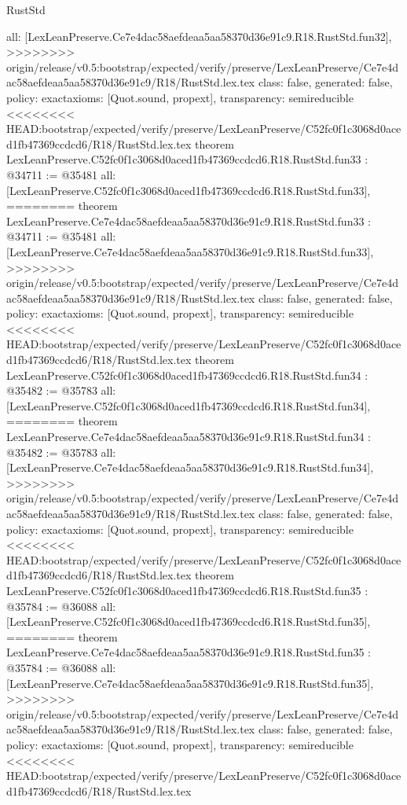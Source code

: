 \begin{lexlean}{RustStd}
\begin{coremodule}
{\begin{coremodule}
{{{{{{{{{{{{{{{{{{{{{{{{{{{{{{{{{{{{  all: [LexLeanPreserve.Ce7e4dac58aefdeaa5aa58370d36e91c9.R18.RustStd.fun32],
>>>>>>>> origin/release/v0.5:bootstrap/expected/verify/preserve/LexLeanPreserve/Ce7e4dac58aefdeaa5aa58370d36e91c9/R18/RustStd.lex.tex
  class: false,
  generated: false,
  policy: exact{axioms: [Quot.sound, propext]},
  transparency: semireducible
}
<<<<<<<< HEAD:bootstrap/expected/verify/preserve/LexLeanPreserve/C52fc0f1c3068d0aced1fb47369ccdcd6/R18/RustStd.lex.tex
theorem LexLeanPreserve.C52fc0f1c3068d0aced1fb47369ccdcd6.R18.RustStd.fun33 : @34711 := @35481 {
  all: [LexLeanPreserve.C52fc0f1c3068d0aced1fb47369ccdcd6.R18.RustStd.fun33],
========
theorem LexLeanPreserve.Ce7e4dac58aefdeaa5aa58370d36e91c9.R18.RustStd.fun33 : @34711 := @35481 {
  all: [LexLeanPreserve.Ce7e4dac58aefdeaa5aa58370d36e91c9.R18.RustStd.fun33],
>>>>>>>> origin/release/v0.5:bootstrap/expected/verify/preserve/LexLeanPreserve/Ce7e4dac58aefdeaa5aa58370d36e91c9/R18/RustStd.lex.tex
  class: false,
  generated: false,
  policy: exact{axioms: [Quot.sound, propext]},
  transparency: semireducible
}
<<<<<<<< HEAD:bootstrap/expected/verify/preserve/LexLeanPreserve/C52fc0f1c3068d0aced1fb47369ccdcd6/R18/RustStd.lex.tex
theorem LexLeanPreserve.C52fc0f1c3068d0aced1fb47369ccdcd6.R18.RustStd.fun34 : @35482 := @35783 {
  all: [LexLeanPreserve.C52fc0f1c3068d0aced1fb47369ccdcd6.R18.RustStd.fun34],
========
theorem LexLeanPreserve.Ce7e4dac58aefdeaa5aa58370d36e91c9.R18.RustStd.fun34 : @35482 := @35783 {
  all: [LexLeanPreserve.Ce7e4dac58aefdeaa5aa58370d36e91c9.R18.RustStd.fun34],
>>>>>>>> origin/release/v0.5:bootstrap/expected/verify/preserve/LexLeanPreserve/Ce7e4dac58aefdeaa5aa58370d36e91c9/R18/RustStd.lex.tex
  class: false,
  generated: false,
  policy: exact{axioms: [Quot.sound, propext]},
  transparency: semireducible
}
<<<<<<<< HEAD:bootstrap/expected/verify/preserve/LexLeanPreserve/C52fc0f1c3068d0aced1fb47369ccdcd6/R18/RustStd.lex.tex
theorem LexLeanPreserve.C52fc0f1c3068d0aced1fb47369ccdcd6.R18.RustStd.fun35 : @35784 := @36088 {
  all: [LexLeanPreserve.C52fc0f1c3068d0aced1fb47369ccdcd6.R18.RustStd.fun35],
========
theorem LexLeanPreserve.Ce7e4dac58aefdeaa5aa58370d36e91c9.R18.RustStd.fun35 : @35784 := @36088 {
  all: [LexLeanPreserve.Ce7e4dac58aefdeaa5aa58370d36e91c9.R18.RustStd.fun35],
>>>>>>>> origin/release/v0.5:bootstrap/expected/verify/preserve/LexLeanPreserve/Ce7e4dac58aefdeaa5aa58370d36e91c9/R18/RustStd.lex.tex
  class: false,
  generated: false,
  policy: exact{axioms: [Quot.sound, propext]},
  transparency: semireducible
}
<<<<<<<< HEAD:bootstrap/expected/verify/preserve/LexLeanPreserve/C52fc0f1c3068d0aced1fb47369ccdcd6/R18/RustStd.lex.tex
}}}}}}}}}}}}}}}}}}}}}}}}}}}}}}}}}}}}}}
\end{coremodule}}
\end{coremodule}
\end{lexlean}
